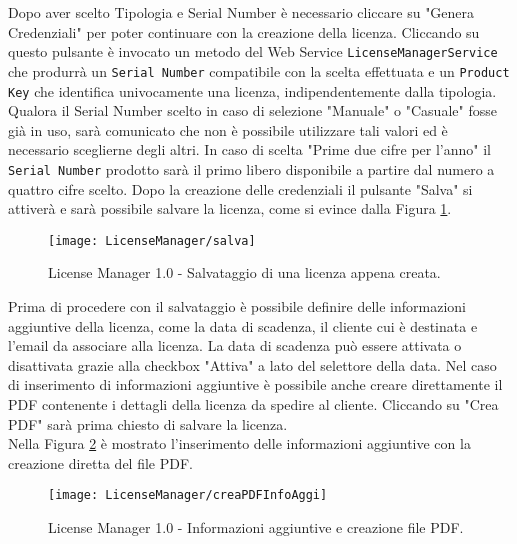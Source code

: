 Dopo aver scelto Tipologia e Serial Number è necessario cliccare su "Genera Credenziali" per poter continuare con la creazione della licenza. Cliccando su questo pulsante è invocato un metodo del Web Service \texttt{LicenseManagerService} che produrrà un \texttt{Serial Number} compatibile con la scelta effettuata e un \texttt{Product Key} che identifica univocamente una licenza, indipendentemente dalla tipologia. Qualora il Serial Number scelto in caso di selezione "Manuale" o "Casuale" fosse già in uso, sarà comunicato che non è possibile utilizzare tali valori ed è necessario sceglierne degli altri. In caso di scelta "Prime due cifre per l’anno" il \texttt{Serial Number} prodotto sarà il primo libero disponibile a partire dal numero a quattro cifre scelto. Dopo la creazione delle credenziali il pulsante "Salva" si attiverà e sarà possibile salvare la licenza, come si evince dalla Figura \ref{salva}.

 \begin{figure}[!h] 
    \centering 
    \texttt{[image: LicenseManager/salva]} 
    \caption{License Manager 1.0 - Salvataggio di una licenza appena creata.}
\label{salva}
\end{figure}

Prima di procedere con il salvataggio è possibile definire delle informazioni aggiuntive della licenza, come la data di scadenza, il cliente cui è destinata e l’email da associare alla licenza. La data di scadenza può essere attivata o disattivata grazie alla checkbox "Attiva" a lato del selettore della data. Nel caso di inserimento di informazioni aggiuntive è possibile anche creare direttamente il PDF contenente i dettagli della licenza da spedire al cliente. Cliccando su "Crea PDF" sarà prima chiesto di salvare la licenza.
\\Nella Figura \ref{pdf} è mostrato l'inserimento delle informazioni aggiuntive con la creazione diretta del file PDF.


\begin{figure}[!h] 
    \centering 
    \texttt{[image: LicenseManager/creaPDFInfoAggi]} 
    \caption{License Manager 1.0 - Informazioni aggiuntive e creazione file PDF.}
\label{pdf}
\end{figure}

